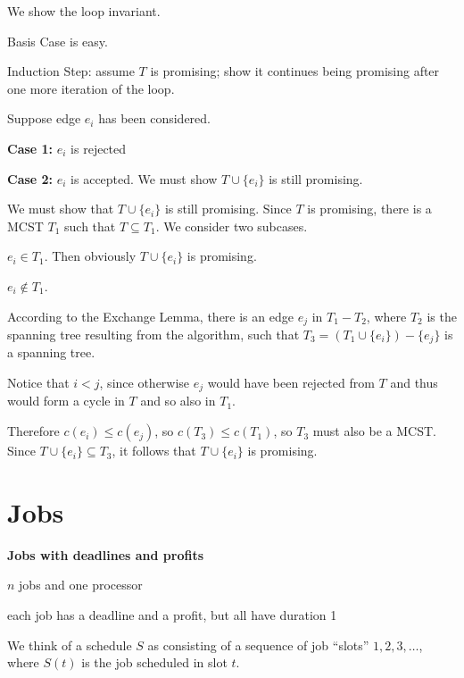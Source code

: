 \begin{frame}
We show the loop invariant.

Basis Case is easy.

Induction Step: assume $T$ is promising; show it continues being
promising after one more iteration of the loop.

Suppose edge $e_i$ has been considered.

{\bf Case 1:} $e_i$ is rejected
\end{frame}

\begin{frame}

{\bf Case 2:} $e_i$ is accepted.  We must show $T\cup\{e_i\}$ is still
promising.

We must show that $T\cup
\{e_i\}$ is still promising.  Since $T$ is promising, there is a
MCST $T_1$ such that $T\subseteq T_1$.  We
consider two subcases.

  $e_i\in T_1$.  Then
obviously $T\cup \{e_i\}$ is promising.  
\end{frame}

\begin{frame}
  $e_i\notin T_1$.  

According to the
Exchange Lemma, there is an edge $e_j$ in $T_1-T_2$, where $T_2$
is the spanning tree resulting from the algorithm, such that $T_3=
(T_1\cup\{e_i\})-\{e_j\}$ is a spanning tree.  

Notice that $i<j$,
since otherwise $e_j$ would have been rejected from $T$ and thus would
form a cycle in $T$ and so also in $T_1$.  

Therefore $c(e_i)\leq
c(e_j)$, so $c(T_3)\leq c(T_1)$, so $T_3$ must also be a 
MCST.  Since $T\cup \{e_i\} \subseteq T_3$, it follows that
$T\cup \{e_i\}$ is promising.
\end{frame}

\section{Jobs}

\begin{frame}
{\bf Jobs with deadlines and profits}

$n$ jobs and one processor

each job has a deadline and a profit, but all have duration 1

We think of a schedule $S$ as consisting of a sequence of job
``slots'' $1,2,3,\ldots$, where $S(t)$ is the job scheduled in slot
$t$.
\end{frame}

